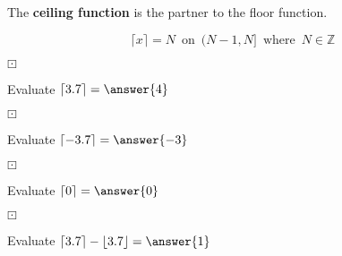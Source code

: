 \documentclass{ximera}
\author{Lee Wayand}
\begin{document}
\begin{exercise}


The \textbf{ceiling function} is the partner to the floor function.



\[
\lceil x \rceil = N \, \text{ on } \, (N-1, N] \, \text{ where } \, N \in \mathbb{Z}
\]



\begin{question} $\boxdot$ 

Evaluate $\lceil 3.7 \rceil = \answer{4}$


\end{question}




\begin{question} $\boxdot$ 

Evaluate $\lceil -3.7 \rceil = \answer{-3}$


\end{question}




\begin{question} $\boxdot$ 

Evaluate $\lceil 0 \rceil = \answer{0}$


\end{question}




\begin{question} $\boxdot$ 

Evaluate $\lceil 3.7 \rceil - \lfloor 3.7 \rfloor = \answer{1}$


\end{question}


\end{exercise}
\end{document}
